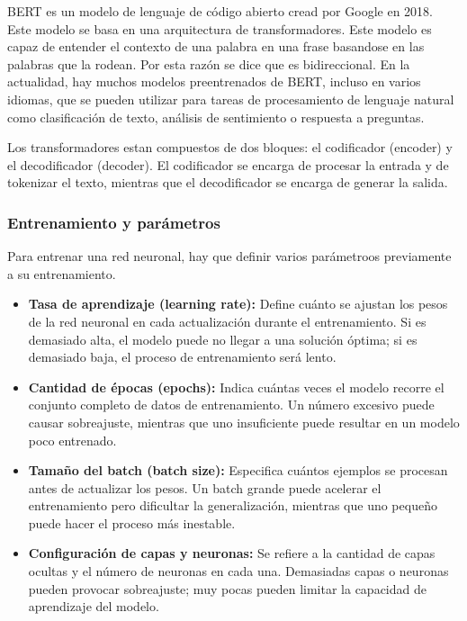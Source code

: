 BERT es un modelo de lenguaje de código abierto cread por Google en 2018. Este modelo se basa en una arquitectura de transformadores.
Este modelo es capaz de entender el contexto de una palabra en una frase basandose en las palabras que la rodean. Por esta razón se dice que es bidireccional.\cite{datacamp:bert}
En la actualidad, hay muchos modelos preentrenados de BERT, incluso en varios idiomas, que se pueden utilizar para tareas de procesamiento de lenguaje natural como clasificación de texto, análisis de sentimiento o respuesta a preguntas.

Los transformadores estan compuestos de dos bloques: el codificador (encoder) y el decodificador (decoder).
El codificador se encarga de procesar la entrada y de tokenizar el texto, mientras que el decodificador se encarga de generar la salida.\cite{datacamp:transformers}

\subsubsection{Entrenamiento y parámetros}

Para entrenar una red neuronal, hay que definir varios parámetroos previamente a su entrenamiento.
\begin{itemize}
	\item \textbf{Tasa de aprendizaje (learning rate):} Define cuánto se ajustan los pesos de la red neuronal en cada actualización durante el entrenamiento. Si es demasiado alta, el modelo puede no llegar a una solución óptima; si es demasiado baja, el proceso de entrenamiento será lento.
	\item \textbf{Cantidad de épocas (epochs):} Indica cuántas veces el modelo recorre el conjunto completo de datos de entrenamiento. Un número excesivo puede causar sobreajuste, mientras que uno insuficiente puede resultar en un modelo poco entrenado.
	\item \textbf{Tamaño del batch (batch size):} Especifica cuántos ejemplos se procesan antes de actualizar los pesos. Un batch grande puede acelerar el entrenamiento pero dificultar la generalización, mientras que uno pequeño puede hacer el proceso más inestable.
	\item \textbf{Configuración de capas y neuronas:} Se refiere a la cantidad de capas ocultas y el número de neuronas en cada una. Demasiadas capas o neuronas pueden provocar sobreajuste; muy pocas pueden limitar la capacidad de aprendizaje del modelo.
\end{itemize}

